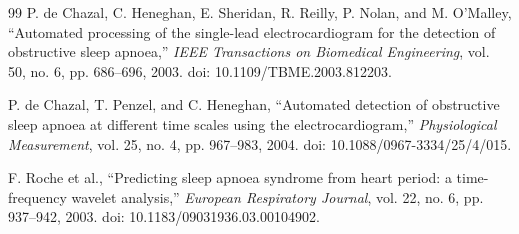 \documentclass[a4paper,10.5pt,oneside]{report}
\begin{document}
\begin{thebibliography}{99}
P. de Chazal, C. Heneghan, E. Sheridan, R. Reilly, P. Nolan, and M. O'Malley, ``Automated processing of the single-lead electrocardiogram for the detection of obstructive sleep apnoea,'' \textit{IEEE Transactions on Biomedical Engineering}, vol. 50, no. 6, pp. 686--696, 2003. doi: 10.1109/TBME.2003.812203.

P. de Chazal, T. Penzel, and C. Heneghan, ``Automated detection of obstructive sleep apnoea at different time scales using the electrocardiogram,'' \textit{Physiological Measurement}, vol. 25, no. 4, pp. 967--983, 2004. doi: 10.1088/0967-3334/25/4/015.

F. Roche et al., ``Predicting sleep apnoea syndrome from heart period: a time-frequency wavelet analysis,'' \textit{European Respiratory Journal}, vol. 22, no. 6, pp. 937--942, 2003. doi: 10.1183/09031936.03.00104902.



\end{thebibliography}
\end{document}
